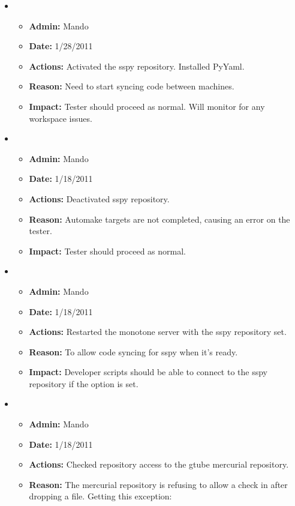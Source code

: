 \documentclass[12pt]{article}
\begin{document}
\begin{itemize}
\item
\begin{itemize}
\item[] {\bf Admin:} Mando
\item[] {\bf Date:} 1/28/2011 
\item[] {\bf Actions:}  Activated the sspy repository. Installed PyYaml.
\item[] {\bf Reason:} Need to start syncing code between machines. 
\item[] {\bf Impact:}  Tester should proceed as normal. Will monitor for any workspace issues.
\end{itemize}


\item
\begin{itemize}
\item[] {\bf Admin:} Mando
\item[] {\bf Date:} 1/18/2011 
\item[] {\bf Actions:}  Deactivated sspy repository.
\item[] {\bf Reason:} Automake targets are not completed, causing an error on the tester.
\item[] {\bf Impact:}  Tester should proceed as normal.
\end{itemize}

\item
\begin{itemize}
\item[] {\bf Admin:} Mando
\item[] {\bf Date:} 1/18/2011 
\item[] {\bf Actions:} Restarted the monotone server with the sspy repository set.
\item[] {\bf Reason:} To allow code syncing for sspy when it's ready.
\item[] {\bf Impact:}  Developer scripts should be able to connect to the sspy repository if the option is set.
\end{itemize}

\item
\begin{itemize}
\item[] {\bf Admin:} Mando
\item[] {\bf Date:} 1/18/2011 
\item[] {\bf Actions:} Checked repository access to the gtube mercurial repository.
\item[] {\bf Reason:} The mercurial repository is refusing to allow a check in after dropping a file. Getting this exception:


\end{itemize}
\end{itemize}
\end{document}
